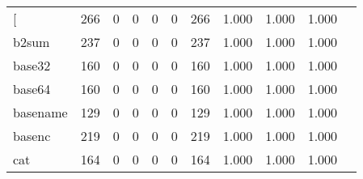 \begin{longtable}{lp{1.10cm}p{1.10cm}p{1.10cm}p{1.10cm}p{1.10cm}p{1.10cm}p{1.10cm}p{1.10cm}p{1.10cm}p{1.10cm}}
\bottomrule
\endlastfoot
{[}         &                    266 &                                  0 &                                 0 &                                0 &                                 0 &                             266 &                             1.000 &                                 1.000 &                               1.000 \\
b2sum     &                    237 &                                  0 &                                 0 &                                0 &                                 0 &                             237 &                             1.000 &                                 1.000 &                               1.000 \\
base32    &                    160 &                                  0 &                                 0 &                                0 &                                 0 &                             160 &                             1.000 &                                 1.000 &                               1.000 \\
base64    &                    160 &                                  0 &                                 0 &                                0 &                                 0 &                             160 &                             1.000 &                                 1.000 &                               1.000 \\
basename  &                    129 &                                  0 &                                 0 &                                0 &                                 0 &                             129 &                             1.000 &                                 1.000 &                               1.000 \\
basenc    &                    219 &                                  0 &                                 0 &                                0 &                                 0 &                             219 &                             1.000 &                                 1.000 &                               1.000 \\
cat       &                    164 &                                  0 &                                 0 &                                0 &                                 0 &                             164 &                             1.000 &                                 1.000 &                               1.000 \\

\end{longtable}
